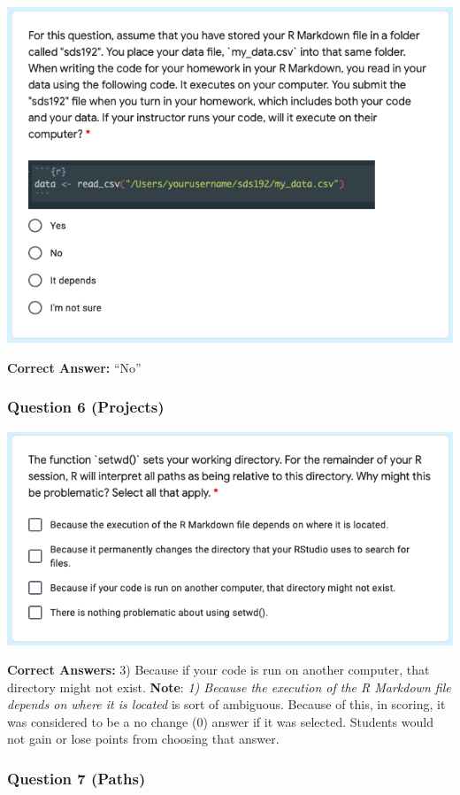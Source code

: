 \documentclass[12pt,twoside]{reedthesis}
\begin{document}
\includegraphics[width=0.8\linewidth]{figure/appendix/test-5}

\textbf{Correct Answer:} ``No''

\hypertarget{question-6-projects}{%
\subsubsection{Question 6 (Projects)}\label{question-6-projects}}

\includegraphics[width=0.8\linewidth]{figure/appendix/test-6}

\textbf{Correct Answers:} 3) Because if your code is run on another computer, that directory might not exist. \textbf{Note}: \emph{1) Because the execution of the R Markdown file depends on where it is located} is sort of ambiguous. Because of this, in scoring, it was considered to be a no change (0) answer if it was selected. Students would not gain or lose points from choosing that answer.

\hypertarget{question-7-paths}{%
\subsubsection{Question 7 (Paths)}\label{question-7-paths}}
\end{document}
